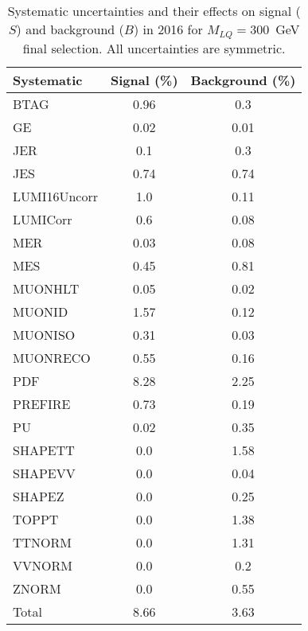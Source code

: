 \begin{table}[htbp]
\begin{center}
\caption{Systematic uncertainties and their effects on signal ($S$) and background ($B$) in 2016 for $M_{LQ}=300$~GeV final selection. All uncertainties are symmetric.}
\begin{tabular}{lcc}
\hline\hline
Systematic & Signal (\%) & Background (\%) \\ \hline 
BTAG & 0.96 & 0.3\\ 
GE & 0.02 & 0.01\\ 
JER & 0.1 & 0.3\\ 
JES & 0.74 & 0.74\\ 
LUMI16Uncorr & 1.0 & 0.11\\ 
LUMICorr & 0.6 & 0.08\\ 
MER & 0.03 & 0.08\\ 
MES & 0.45 & 0.81\\ 
MUONHLT & 0.05 & 0.02\\ 
MUONID & 1.57 & 0.12\\ 
MUONISO & 0.31 & 0.03\\ 
MUONRECO & 0.55 & 0.16\\ 
PDF & 8.28 & 2.25\\ 
PREFIRE & 0.73 & 0.19\\ 
PU & 0.02 & 0.35\\ 
SHAPETT & 0.0 & 1.58\\ 
SHAPEVV & 0.0 & 0.04\\ 
SHAPEZ & 0.0 & 0.25\\ 
TOPPT & 0.0 & 1.38\\ 
TTNORM & 0.0 & 1.31\\ 
VVNORM & 0.0 & 0.2\\ 
ZNORM & 0.0 & 0.55\\ 
Total & 8.66 & 3.63\\ \hline \hline
\end{tabular}
\label{tab:SysUncertainties_uujj_300}
\end{center}
\end{table}

